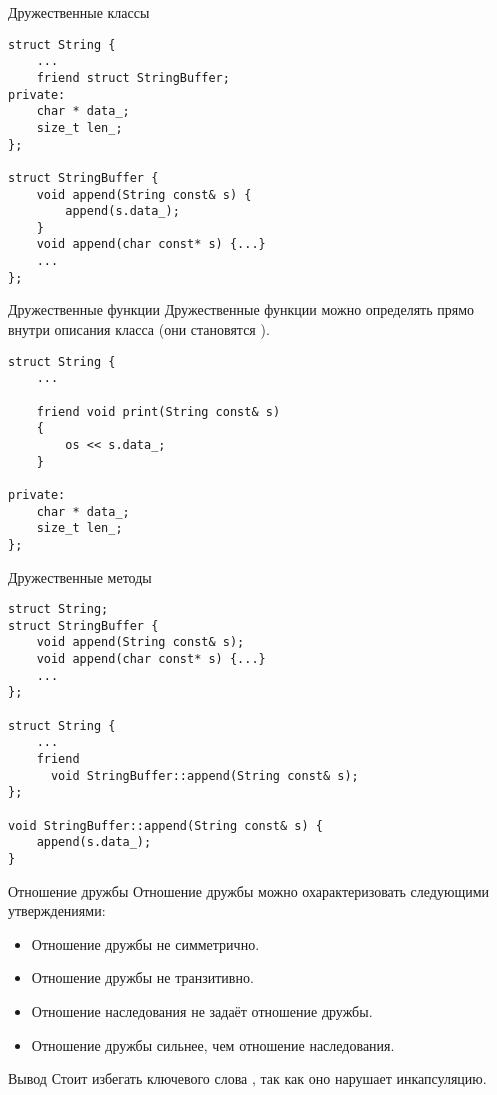 \documentclass{beamer}
\begin{document}
\begin{frame}[fragile]{Дружественные классы}
\begin{lstlisting}
struct String {
    ...
    friend struct StringBuffer;
private:
    char * data_;
    size_t len_;
};

struct StringBuffer {
    void append(String const& s) {
        append(s.data_);
    }
    void append(char const* s) {...}
    ...
};                   
\end{lstlisting}
\end{frame}

\begin{frame}[fragile]{Дружественные функции}{}
    Дружественные функции можно определять прямо внутри описания
    класса (они становятся ).
\begin{lstlisting}
struct String {
    ...
    
    friend void print(String const& s) 
    {
        os << s.data_;
    }

private:
    char * data_;
    size_t len_;
};                   
\end{lstlisting}
\end{frame}

\begin{frame}[fragile]{Дружественные методы}
\begin{lstlisting}
struct String;
struct StringBuffer {
    void append(String const& s);
    void append(char const* s) {...}
    ...
};                   

struct String {
    ...
    friend 
      void StringBuffer::append(String const& s);
};
        
void StringBuffer::append(String const& s) {
    append(s.data_);
}
\end{lstlisting}
\end{frame}

\begin{frame}[fragile]{Отношение дружбы}
    Отношение дружбы можно охарактеризовать следующими 
    утверждениями: 
    \begin{itemize}
        \item Отношение дружбы не симметрично.
        \item Отношение дружбы не транзитивно.
        \item Отношение наследования не задаёт
            отношение дружбы.
        \item Отношение дружбы сильнее, чем 
            отношение наследования. 
    \end{itemize}
    \begin{block}{Вывод}
        Стоит избегать ключевого слова , так как оно нарушает
        инкапсуляцию.
    \end{block}
\end{frame}
\end{document}
